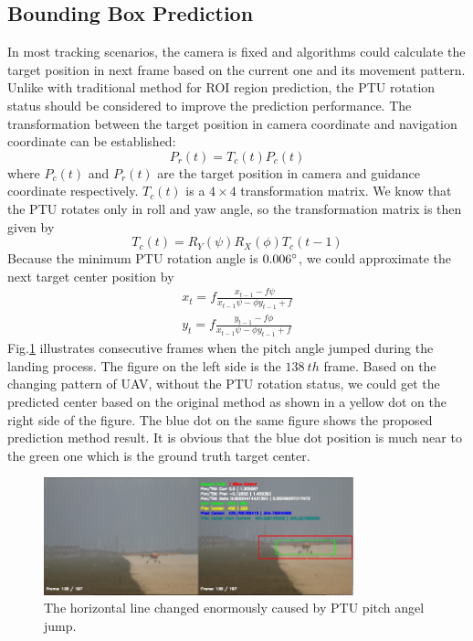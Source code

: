 \subsection{Bounding Box Prediction}
In most tracking scenarios, the camera is fixed and algorithms could calculate the target position in next frame based on the current one and its movement pattern. Unlike with traditional method for ROI region prediction, the PTU rotation status should be considered to improve the prediction performance. The transformation between the target position in camera coordinate and navigation coordinate can be established:
\begin{equation}
	P_r(t) = T_c(t) P_c(t)
\end{equation}
where $P_c(t)$ and $P_r(t)$ are the target position in camera and guidance coordinate respectively. $T_c(t)$ is a $4 \times 4$ transformation matrix. We know that the PTU rotates only in roll and yaw angle, so the transformation matrix is then given by 
\begin{equation}
	T_c(t) = R_Y(\psi)R_X(\phi)T_c(t-1)
\end{equation}
Because the minimum PTU rotation angle is $0.006 \degree$, we could approximate the next target center position by
\begin{align}
	\label{eq:prev_predict_curr}
	x_{t} = f\frac{x_{t-1} - f\psi }{x_{t-1}  \psi  - \phi y_{t-1} + f} \\
	y_{t} = f\frac{y_{t-1} -f\phi}{  x_{t-1} \psi - \phi y_{t-1} + f}
\end{align}
Fig.\ref{fig:chp04_17_predict_1} illustrates consecutive frames when the pitch angle jumped during the landing process. The figure on the left side is the $138\ th$ frame. Based on the changing pattern of UAV, without the PTU rotation status, we could get the predicted center based on the original method as shown in a yellow dot on the right side of the figure. The blue dot on the same figure shows the proposed prediction method result. It is obvious that the blue dot position is much near to the green one which is the ground truth target center.

\begin{figure}[!th]
	\centering
	\includegraphics[width=0.8\textwidth]{Figs/chp04_17_predict_1.pdf}
	\caption{The horizontal line changed enormously caused by PTU pitch angel jump. }
	\label{fig:chp04_17_predict_1}    
\end{figure}


